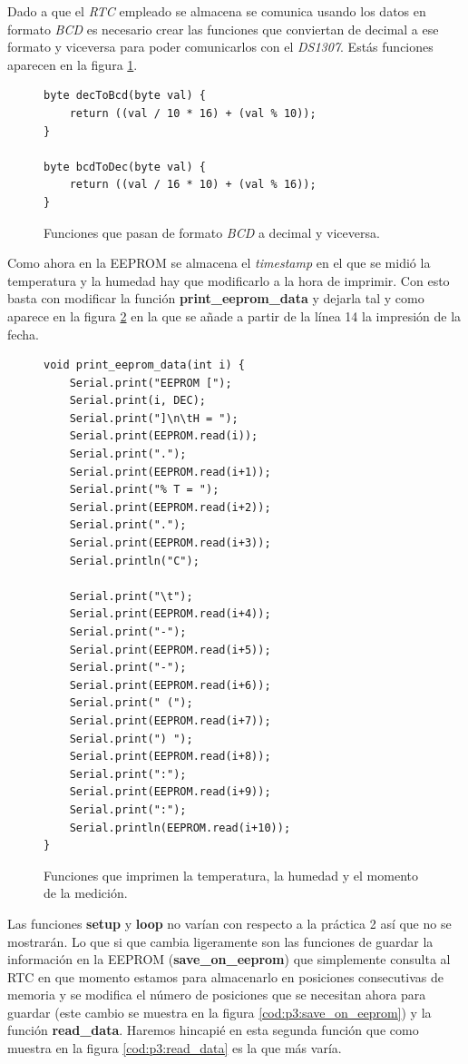 \documentclass{article}
\begin{document}
	Dado a que el \textit{RTC} empleado se almacena se comunica usando los datos en formato \textit{BCD} es necesario crear las funciones que conviertan de decimal a ese formato y viceversa para poder comunicarlos con el \textit{DS1307}. Estás funciones aparecen en la figura \ref{cod:p3:DEC_BCD}.

\begin{figure}[h]
	\begin{lstlisting}[style=c]
byte decToBcd(byte val) {
    return ((val / 10 * 16) + (val % 10)); 
} 

byte bcdToDec(byte val) {
    return ((val / 16 * 10) + (val % 16)); 
}
	\end{lstlisting}
	\caption{Funciones que pasan de formato \textit{BCD} a decimal y viceversa.}
	\label{cod:p3:DEC_BCD}
\end{figure}

	Como ahora en la EEPROM se almacena el \textit{timestamp} en el que se midió la temperatura y la humedad hay que modificarlo a la hora de imprimir. Con esto basta con modificar la función \textbf{print\_eeprom\_data} y dejarla tal y como aparece en la figura \ref{cod:p3:print_eeprom_data} en la que se añade a partir de la línea 14 la impresión de la fecha.

\begin{figure}[h]
	\begin{lstlisting}[style=c]
void print_eeprom_data(int i) {
    Serial.print("EEPROM [");
    Serial.print(i, DEC);
    Serial.print("]\n\tH = ");
    Serial.print(EEPROM.read(i));
    Serial.print(".");
    Serial.print(EEPROM.read(i+1));
    Serial.print("% T = ");
    Serial.print(EEPROM.read(i+2));
    Serial.print(".");
    Serial.print(EEPROM.read(i+3));
    Serial.println("C");
    
    Serial.print("\t");
    Serial.print(EEPROM.read(i+4));
    Serial.print("-");
    Serial.print(EEPROM.read(i+5));
    Serial.print("-");
    Serial.print(EEPROM.read(i+6));
    Serial.print(" (");
    Serial.print(EEPROM.read(i+7));
    Serial.print(") ");
    Serial.print(EEPROM.read(i+8));
    Serial.print(":");
    Serial.print(EEPROM.read(i+9));
    Serial.print(":");
    Serial.println(EEPROM.read(i+10)); 
}
	\end{lstlisting}
	\caption{Funciones que imprimen la temperatura, la humedad y el momento de la medición.}
	\label{cod:p3:print_eeprom_data}
\end{figure}

	Las funciones \textbf{setup} y \textbf{loop} no varían con respecto a la práctica 2 así que no se mostrarán. Lo que si que cambia ligeramente son las funciones de guardar la información en la EEPROM (\textbf{save\_on\_eeprom}) que simplemente consulta al RTC en que momento estamos para almacenarlo en posiciones consecutivas de memoria y se modifica el número de posiciones que se necesitan ahora para guardar (este cambio se muestra en la figura \ref{cod:p3:save_on_eeprom}) y la función \textbf{read\_data}. Haremos hincapié en esta segunda función que como muestra en la figura \ref{cod:p3:read_data}  es la que más varía.
\end{document}
